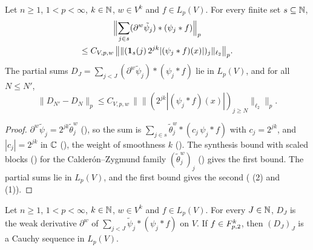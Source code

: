 \begin{lemma}
\label{lem:derivative-synthesis-bound}
\leanok
{}
Let $n \geq 1$, $1 < p < \infty$, $k \in \mathbb{N}$, $w \in V^k$ and $f \in L_p(V)$. For every finite
set $s \subseteq \mathbb{N}$,
\begin{multline*}
  \Bigl\| \sum_{j \in s} (\partial^w \tilde\psi_j) * (\psi_j * f) \Bigr\|_p \\
  \leq C_{V,p,w} \, \bigl\| \|(\mathbf 1_s(j) \, 2^{jk} |(\psi_j * f)(x)|)_j\|_{\ell_2}
  \bigr\|_p .
\end{multline*}
The partial sums $D_J = \sum_{j < J} (\partial^w \tilde\psi_j) * (\psi_j * f)$ lie in $L_p(V)$,
and for all $N \leq N'$,
\[
  \|D_{N'} - D_N\|_p \leq C_{V,p,w} \,
  \bigl\| \|(2^{jk} |(\psi_j * f)(x)|)_{j \geq N}\|_{\ell_2} \bigr\|_p .
\]
\end{lemma}

\begin{proof}
\leanok
$\partial^w \tilde\psi_j = 2^{jk} \tilde\theta^w_j$ (), so the
sum is $\sum_{j \in s} \tilde\theta^w_j * (c_j \, \psi_j * f)$ with $c_j = 2^{jk}$, and
$|c_j| = 2^{jk}$ in $\mathbb{C}$ (), the weight of
smoothness $k$ (). The synthesis bound with scaled blocks
() for the Calder\'on--Zygmund family $(\tilde\theta^w_j)_j$
() gives the first bound. The partial sums lie in $L_p(V)$,
and the first bound gives the second ( (2) and (1)).
\end{proof}

\begin{lemma}
\label{lem:derivative-partial-sums}
\leanok
{}
Let $n \geq 1$, $1 < p < \infty$, $k \in \mathbb{N}$, $w \in V^k$ and $f \in L_p(V)$. For every
$J \in \mathbb{N}$, $D_J$ is the weak derivative $\partial^w$ of $\sum_{j < J} \tilde\psi_j * (\psi_j * f)$
on $V$. If $f \in F^{k}_{p,2}$, then $(D_J)_J$ is a Cauchy sequence in $L_p(V)$.
\end{lemma}

